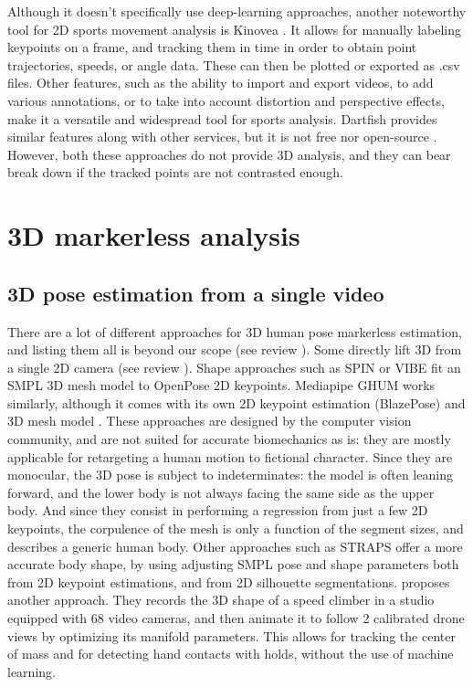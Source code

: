 Although it doesn't specifically use deep-learning approaches, another noteworthy tool for 2D sports movement analysis is Kinovea \cite{Kinovea,Fernandez2020}. It allows for manually labeling keypoints on a frame, and tracking them in time in order to obtain point trajectories, speeds, or angle data. These can then be plotted or exported as .csv files. Other features, such as the ability to import and export videos, to add various annotations, or to take into account distortion and perspective effects, make it a versatile and widespread tool for sports analysis. Dartfish provides similar features along with other services, but it is not free nor open-source \cite{Dartfish}. However, both these approaches do not provide 3D analysis, and they can bear break down if the tracked points are not contrasted enough.

\FloatBarrier
\section{3D markerless analysis} 
\subsection{3D pose estimation from a single video}

There are a lot of different approaches for 3D human pose markerless estimation, and listing them all is beyond our scope (see review \cite{Wang2021a}). Some directly lift 3D from a single 2D camera (see review \cite{Liu2022b}). Shape approaches such as SPIN \cite{Kolotouros2019} or VIBE \cite{Kocabas2020} fit an SMPL 3D mesh model \cite{Loper2015} to OpenPose 2D keypoints. Mediapipe GHUM works similarly, although it comes with its own 2D keypoint estimation (BlazePose) and 3D mesh model \cite{Xu2020b}. These approaches are designed by the computer vision community, and are not suited for accurate biomechanics as is: they are mostly applicable for retargeting a human motion to fictional character. Since they are monocular, the 3D pose is subject to indeterminates: the model is often leaning forward, and the lower body is not always facing the same side as the upper body. And since they consist in performing a regression from just a few 2D keypoints, the corpulence of the mesh is only a function of the segment sizes, and describes a generic human body. Other approaches such as STRAPS \cite{Sengupta2020} offer a more accurate body shape, by using adjusting SMPL pose and shape parameters both from 2D keypoint estimations, and from 2D silhouette segmentations. \cite{Reveret2020} proposes another approach. They records the 3D shape of a speed climber in a studio equipped with 68 video cameras, and then animate it to follow 2 calibrated drone views by optimizing its manifold parameters. This allows for tracking the center of mass and for detecting hand contacts with holds, without the use of machine learning. 

